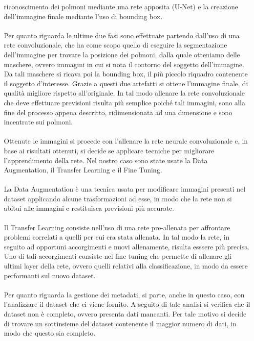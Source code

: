 riconoscimento dei polmoni mediante una rete apposita (U-Net) e la creazione dell'immagine finale mediante l'uso di bounding box.
\\\\
Per quanto riguarda le ultime due fasi sono effettuate partendo dall'uso di una rete convoluzionale, che ha come scopo 
quello di eseguire la segmentazione dell'immagine per trovare la posizione dei polmoni, dalla quale otteniamo delle maschere, ovvero 
immagini in cui si nota il contorno del soggetto dell'immagine. Da tali maschere si ricava poi la bounding box, il più piccolo
riquadro contenente il soggetto d'interesse.
Grazie a questi due artefatti si ottene l'immagine finale, di qualità migliore rispetto all'originale.
In tal modo allenare la rete convoluzionale che deve effettuare previsioni risulta più semplice poiché tali immagini, sono alla fine del
processo appena descritto, ridimensionata ad una dimensione e sono incentrate sui polmoni. 
\\\\
Ottenute le immagini si procede con l'allenare la rete neurale convoluzionale e, in base ai risultati ottenuti, si decide se applicare 
tecniche per migliorare l'apprendimento della rete. Nel nostro caso sono state usate la Data Augmentation, il Transfer Learning e il Fine Tuning.
\\\\
La Data Augmentation è una tecnica usata per modificare immagini presenti nel dataset applicando alcune trasformazioni ad esse, in modo 
che la rete non si abitui alle immagini e restituisca previsioni più accurate.
\\\\
Il Transfer Learning consiste nell'uso di una rete pre-allenata per affrontare problemi correlati a quelli per cui era stata allenata.
In tal modo la rete, in seguito ad opportuni accorgimenti e nuovi allenamente, risulta esssere più precisa.
Uno di tali accorgimenti consiste nel fine tuning che permette di allenare gli ultimi layer della rete, ovvero quelli relativi alla classificazione,
in modo da essere performanti sul nuovo dataset.
\\\\
Per quanto riguarda la gestione dei metadati, si parte, anche in questo caso, con l'analizzare il dataset che ci viene fornito.
A seguito di tale analisi si verifica che il dataset non è completo, ovvero presenta dati mancanti. Per tale motivo si decide di 
trovare un sottinsieme del dataset contenente il maggior numero di dati, in modo che questo sia completo.
